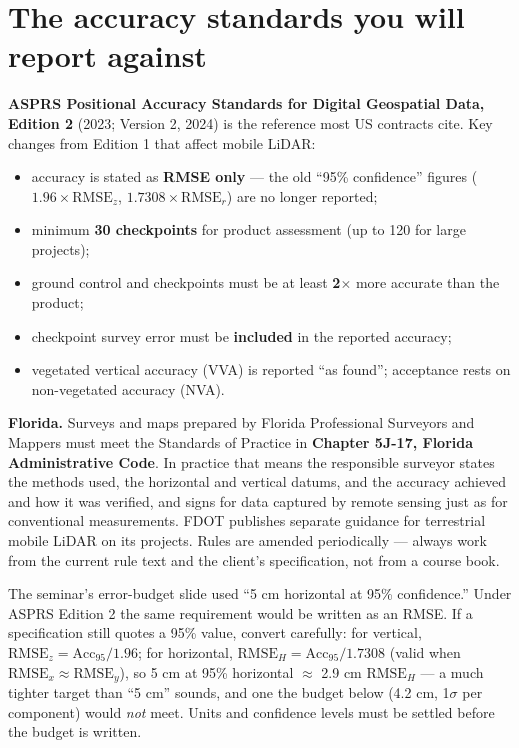 \section{The accuracy standards you will report against}
\begin{eng}
\textbf{ASPRS Positional Accuracy Standards for Digital Geospatial Data, Edition 2} (2023; Version 2, 2024) is the reference most US contracts cite. Key changes from Edition 1 that affect mobile LiDAR:
\begin{itemize}
\item accuracy is stated as \textbf{RMSE only} --- the old ``95\% confidence'' figures ($1.96\times\text{RMSE}_z$, $1.7308\times\text{RMSE}_r$) are no longer reported;
\item minimum \textbf{30 checkpoints} for product assessment (up to 120 for large projects);
\item ground control and checkpoints must be at least \textbf{2$\times$} more accurate than the product;
\item checkpoint survey error must be \textbf{included} in the reported accuracy;
\item vegetated vertical accuracy (VVA) is reported ``as found''; acceptance rests on non-vegetated accuracy (NVA).
\end{itemize}
\textbf{Florida.} Surveys and maps prepared by Florida Professional Surveyors and Mappers must meet the Standards of Practice in \textbf{Chapter 5J-17, Florida Administrative Code}. In practice that means the responsible surveyor states the methods used, the horizontal and vertical datums, and the accuracy achieved and how it was verified, and signs for data captured by remote sensing just as for conventional measurements. FDOT publishes separate guidance for terrestrial mobile LiDAR on its projects. Rules are amended periodically --- always work from the current rule text and the client's specification, not from a course book.
\end{eng}

\begin{improve}
The seminar's error-budget slide used ``5 cm horizontal at 95\% confidence.'' Under ASPRS Edition 2 the same requirement would be written as an RMSE. If a specification still quotes a 95\% value, convert carefully: for vertical, $\text{RMSE}_z=\text{Acc}_{95}/1.96$; for horizontal, $\text{RMSE}_H=\text{Acc}_{95}/1.7308$ (valid when $\text{RMSE}_x\approx\text{RMSE}_y$), so 5 cm at 95\% horizontal $\approx$ 2.9 cm $\text{RMSE}_H$ --- a much tighter target than ``5 cm'' sounds, and one the budget below (4.2 cm, 1$\sigma$ per component) would \emph{not} meet. Units and confidence levels must be settled before the budget is written.
\end{improve}

